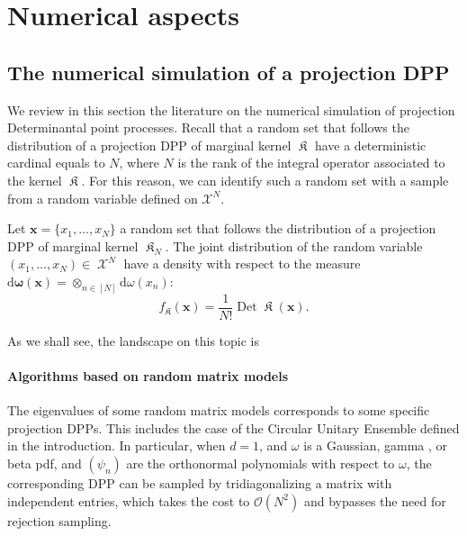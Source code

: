 \documentclass[twoside,11pt]{book}
\numberwithin{theorem}{chapter}
\numberwithin{definition}{chapter}
\numberwithin{proposition}{chapter}
\numberwithin{corollary}{chapter}
\numberwithin{example}{chapter}
\numberwithin{lemma}{chapter}
\DeclareMathOperator{\Det}{Det}
\DeclareMathOperator*{\KDPP}{\mathfrak{K}}
\DeclareMathOperator{\X}{\mathcal{X}}
\begin{document}
\section{Numerical aspects}\label{sec:num_algos_dpps}
\subsection{The numerical simulation of a projection DPP}
We review in this section the literature on the numerical simulation of projection Determinantal point processes. Recall that a random set that follows the distribution of a projection DPP of marginal kernel $\KDPP$ have a deterministic cardinal equals to $N$, where $N$ is the rank of the integral operator associated to the kernel $\KDPP$. For this reason, we can identify such a random set with a sample from a random variable defined on $\mathcal{X}^{N}$.

Let $\bm{x} = \{x_{1}, \dots, x_{N}\}$ a random set that follows the distribution of a projection DPP of marginal kernel $\KDPP_{N}$. The joint distribution of the random variable $(x_{1}, \dots, x_{N}) \in \X^{N}$ have a density with respect to the measure $\mathrm{d}\bm{\omega}(\bm{x}) = \otimes_{n\in [N]}\mathrm{d}\omega(x_{n})$:
\begin{equation}\label{eq:det_density}
f_{\KDPP}(\bm{x}) = \frac{1}{N!}\Det \bm{\KDPP}(\bm{x}).
\end{equation}

As we shall see, the landscape on this topic is 

\paragraph{Algorithms based on random matrix models}
The eigenvalues of some random matrix models corresponds to some specific projection DPPs. This includes the case of the Circular Unitary Ensemble defined in the introduction.
In particular, when $d=1$, and $\omega$ is a Gaussian, gamma \cite{DuEd02}, or beta \cite{KiNe04} pdf, and $(\psi_n)$ are the orthonormal polynomials with respect to $\omega$, the corresponding DPP can be sampled by tridiagonalizing a matrix with independent entries, which takes the cost to $\mathcal{O}(N^2)$ and bypasses the need for rejection sampling. 
\end{document}
